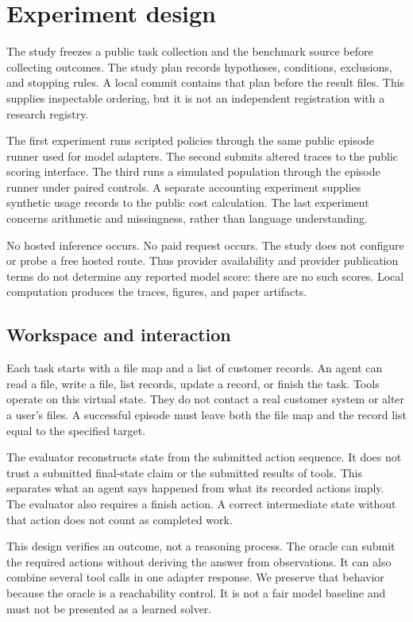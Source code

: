 \documentclass{article}
\begin{document}
\section{Experiment design}
The study freezes a public task collection and the benchmark source before collecting outcomes. The study plan records hypotheses, conditions, exclusions, and stopping rules. A local commit contains that plan before the result files. This supplies inspectable ordering, but it is not an independent registration with a research registry.\par
The first experiment runs scripted policies through the same public episode runner used for model adapters. The second submits altered traces to the public scoring interface. The third runs a simulated population through the episode runner under paired controls. A separate accounting experiment supplies synthetic usage records to the public cost calculation. The last experiment concerns arithmetic and missingness, rather than language understanding.\par
No hosted inference occurs. No paid request occurs. The study does not configure or probe a free hosted route. Thus provider availability and provider publication terms do not determine any reported model score: there are no such scores. Local computation produces the traces, figures, and paper artifacts.\par
\subsection{Workspace and interaction}
Each task starts with a file map and a list of customer records. An agent can read a file, write a file, list records, update a record, or finish the task. Tools operate on this virtual state. They do not contact a real customer system or alter a user's files. A successful episode must leave both the file map and the record list equal to the specified target.\par
The evaluator reconstructs state from the submitted action sequence. It does not trust a submitted final-state claim or the submitted results of tools. This separates what an agent says happened from what its recorded actions imply. The evaluator also requires a finish action. A correct intermediate state without that action does not count as completed work.\par
This design verifies an outcome, not a reasoning process. The oracle can submit the required actions without deriving the answer from observations. It can also combine several tool calls in one adapter response. We preserve that behavior because the oracle is a reachability control. It is not a fair model baseline and must not be presented as a learned solver.\par
\end{document}
